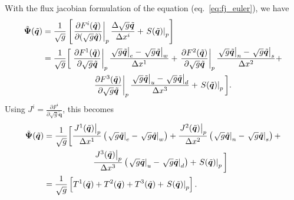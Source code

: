 \documentclass[12pt]{article}
\begin{document}
With the flux jacobian formulation of the equation (eq.~\ref{eq:fj_euler}), we have
\begin{align}
    \tilde{\bm{\Psi}}(\tilde{\bm{q}})
    &= \dfrac{1}{\sqrt{g}} 
    \left[
        \left.\dfrac{\partial F^i(\tilde{\bm{q}})}{\partial(\sqrt{g}\tilde{\bm{q}})}\right|_{p}
            \dfrac{\Delta\sqrt{g}\tilde{\bm{q}}}{\Delta x^i}
          + \left.S(\tilde{\bm{q}})\right|_p
    \right] \\
    &= \dfrac{1}{\sqrt{g}} \bigg[
    \left. \dfrac{\partial F^1(\tilde{\bm{q}})}{\partial\sqrt{g}\tilde{\bm{q}}} \right|_p
      \dfrac{ \left.\sqrt{g}\tilde{\bm{q}}\right|_e - \left.\sqrt{g}\tilde{\bm{q}}\right|_w }{\Delta x^1} +
    \left. \dfrac{\partial F^2(\tilde{\bm{q}})}{\partial\sqrt{g}\tilde{\bm{q}}} \right|_p
      \dfrac{ \left.\sqrt{g}\tilde{\bm{q}}\right|_n - \left.\sqrt{g}\tilde{\bm{q}}\right|_s }{\Delta x^2} +
        \notag\\ & \qquad\qquad\qquad
    \left. \dfrac{\partial F^3(\tilde{\bm{q}})}{\partial\sqrt{g}\tilde{\bm{q}}} \right|_p
      \dfrac{ \left.\sqrt{g}\tilde{\bm{q}}\right|_u - \left.\sqrt{g}\tilde{\bm{q}}\right|_d }{\Delta x^3} +
    \left.S(\tilde{\bm{q}})\right|_{p}
    \bigg]
    \text{.}
\end{align}
Using $J^i = \frac{\partial F^i}{\partial\sqrt{g}\tilde{\bm{q}}}$, this becomes
\begin{align}
    \tilde{\bm{\Psi}}(\tilde{\bm{q}})
    &= \dfrac{1}{\sqrt{g}}\bigg[
        \dfrac{\left.J^1(\tilde{\bm{q}})\right|_p}{\Delta x^1} \left( \left.\sqrt{g}\tilde{\bm{q}}\right|_e - \left.\sqrt{g}\tilde{\bm{q}}\right|_w \right) +
        \dfrac{\left.J^2(\tilde{\bm{q}})\right|_p}{\Delta x^2} \left( \left.\sqrt{g}\tilde{\bm{q}}\right|_n - \left.\sqrt{g}\tilde{\bm{q}}\right|_s \right) +
        \notag\\ & \qquad\qquad\qquad
        \dfrac{\left.J^3(\tilde{\bm{q}})\right|_p}{\Delta x^3} \left( \left.\sqrt{g}\tilde{\bm{q}}\right|_u - \left.\sqrt{g}\tilde{\bm{q}}\right|_d \right) +
        \left.S(\tilde{\bm{q}})\right|_p
    \bigg] \\
    &= \dfrac{1}{\sqrt{g}} \left[
        T^1(\tilde{\bm{q}}) + T^2(\tilde{\bm{q}}) + T^3(\tilde{\bm{q}}) + \left.S(\tilde{\bm{q}})\right|_p
    \right]
    \text{.}
\end{align}
\end{document}
